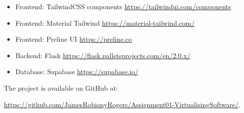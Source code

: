 \documentclass[a4paper, 11pt]{article}
\begin{document}
\begin{itemize}
    \item Frontend: TailwindCSS components \url{https://tailwindui.com/components}
    \item Frontend: Material Tailwind \url{https://material-tailwind.com/}
    \item Frontend: Preline UI \url{https://preline.co}
    \item Backend: Flask \url{https://flask.palletsprojects.com/en/2.0.x/}
    \item Database: Supabase \url{https://supabase.io/}
\end{itemize}

The project is available on GitHub at:

\url{https://github.com/JamesRobionyRogers/Assignment01-VirtualisingSoftware/}.
\end{document}
